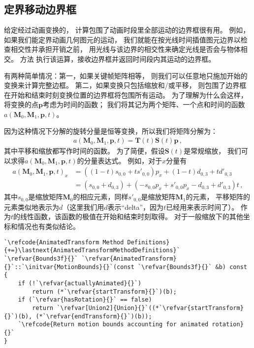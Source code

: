 \subsection{定界移动边界框}\label{sub:定界移动边界框}
给定经过动画变换的，
计算包围了动画时段里全部运动的边界框很有用。
例如，如果我们能定界动画几何图元的运动，
我们就能在按光线时间插值图元边界以检查相交性并承担开销之前，
用光线与该边界的相交性来确定光线是否会与物体相交。
方法
执行该运算，接收边界框并返回时间段内其运动的边界框。

有两种简单情况：第一，如果关键帧矩阵相等，
则我们可以任意地只施加开始的变换来计算完整边框。
第二，如果变换只包括缩放和/或平移，
则包围了边界框在开始和结束时刻变换位置的边界框将包围所有运动。
为了理解为什么会这样，将变换的点$\bm p$考虑为时间的函数；
我们将其记为两个矩阵、一个点和时间的函数$a(\bm M_0,\bm M_1,\bm p,t)$。

因为这种情况下分解的旋转分量是恒等变换，所以我们将矩阵分解为：
\begin{align*}
    a(\bm M_0,\bm M_1,\bm p,t)=\bm T(t)\bm S(t)\bm p\, ,
\end{align*}
其中平移和缩放都写作时间的函数。
为了简便，假设$\bm S(t)$是常规缩放，
我们可以求得$a(\bm M_0,\bm M_1,\bm p,t)$的分量表达式。
例如，对于$x$分量有
\begin{align*}
    a(\bm M_0,\bm M_1,\bm p,t)_x & =((1-t)s_{0,0}+ts'_{0,0})p_x+(1-t)d_{0,3}+td'_{0,3}                \\
                                 & =(s_{0,0}+d_{0,3})+(-s_{0,0}p_x+s'_{0,0}p_x-d_{0,3}+d'_{0,3})t\, ,
\end{align*}
其中$s_{0,0}$是缩放矩阵$\bm M_0$的相应元素，同样$s'_{0,0}$是缩放矩阵$\bm M_1$的元素，
平移矩阵的元素类似地表示为$d$（这里我们用$d$表示“delta”，因为$t$已经用来表示时间了）。
作为$t$的线性函数，该函数的极值在开始和结束时刻取得。
对于一般缩放下的其他坐标和情况也有类似结论。
\begin{lstlisting}
`\refcode{AnimatedTransform Method Definitions}{+=}\lastnext{AnimatedTransformMethodDefinitions}`
`\refvar{Bounds3f}{}` `\refvar{AnimatedTransform}{}`::`\initvar{MotionBounds}{}`(const `\refvar{Bounds3f}{}` &b) const {
    if (!`\refvar{actuallyAnimated}{}`)
        return (*`\refvar{startTransform}{}`)(b);
    if (`\refvar{hasRotation}{}` == false)
        return `\refvar[Union2]{Union}{}`((*`\refvar{startTransform}{}`)(b), (*`\refvar{endTransform}{}`)(b));
    `\refcode{Return motion bounds accounting for animated rotation}{}`
}
\end{lstlisting}

